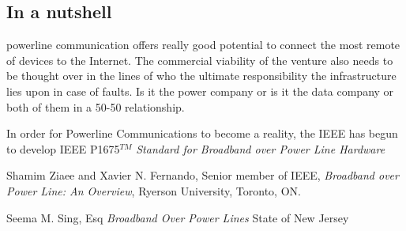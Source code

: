 \documentclass[11pt]{article}
\begin{document}
\begin{multicols}{2}
\section*{In a nutshell}
powerline communication offers really good potential to connect the most remote of devices to the Internet. The commercial viability of the venture also needs to be thought over in the lines of who the ultimate responsibility the infrastructure lies upon in case of faults. Is it the power company or is it the data company or both of them in a 50-50 relationship.

In order for Powerline Communications to become a reality, the IEEE has begun to develop IEEE P1675$^{TM}$ \emph{Standard for Broadband over Power Line Hardware}

\begin{thebibliography}{9}


Shamim Ziaee and Xavier N. Fernando, Senior member of IEEE,
\emph{Broadband over Power Line: An Overview},
Ryerson University, Toronto, ON.

Seema M. Sing, Esq
\emph{Broadband Over Power Lines}
 State of New Jersey
  


\end{thebibliography}


\end{multicols}
\end{document}
